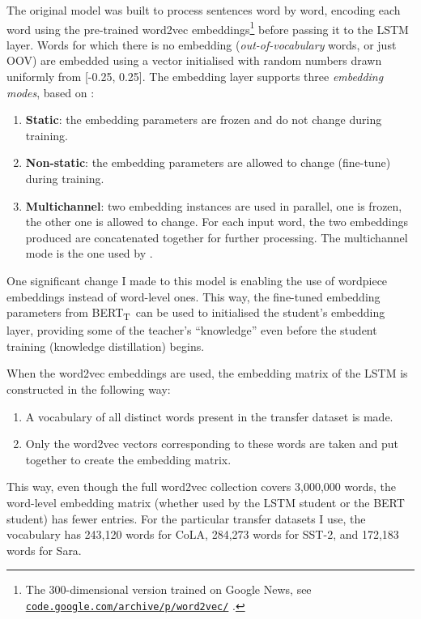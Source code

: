 \documentclass[bsc,frontabs,singlespacing,parskip,deptreport]{infthesis}
\def\BERTT{BERT\textsubscript{T}}
\newcommand\rurl[1]{%
  \href{https://#1}{\nolinkurl{#1}}%
}
\begin{document}
{{{      The original model was built to process sentences word by word, encoding each word using the pre-trained word2vec embeddings\footnote{The 300-dimensional version trained on Google News, see \rurl{code.google.com/archive/p/word2vec/}.} before passing it to the LSTM layer. Words for which there is no embedding (\textit{out-of-vocabulary} words, or just OOV) are embedded using a vector initialised with random numbers drawn uniformly from [-0.25, 0.25]. The embedding layer supports three \textit{embedding modes}, based on \citet{Kim_2014}:
      \begin{enumerate}
        \item \textbf{Static}: the embedding parameters are frozen and do not change during training.
        \item \textbf{Non-static}: the embedding parameters are allowed to change (fine-tune) during training.
        \item \textbf{Multichannel}: two embedding instances are used in parallel, one is frozen, the other one is allowed to change. For each input word, the two embeddings produced are concatenated together for further processing. The multichannel mode is the one used by \citeauthor{Tang_2019b}.
      \end{enumerate}

      One significant change I made to this model is enabling the use of wordpiece embeddings instead of word-level ones. This way, the fine-tuned embedding parameters from \BERTT~can be used to initialised the student's embedding layer, providing some of the teacher's ``knowledge'' even before the student training (knowledge distillation) begins.

      When the word2vec embeddings are used, the embedding matrix of the LSTM is constructed in the following way:
      \begin{enumerate}
        \item A vocabulary of all distinct words present in the transfer dataset is made.
        \item Only the word2vec vectors corresponding to these words are taken and put together to create the embedding matrix.
      \end{enumerate}
      This way, even though the full word2vec collection covers 3,000,000 words, the word-level embedding matrix (whether used by the LSTM student or the BERT student) has fewer entries. For the particular transfer datasets I use, the vocabulary has 243,120 words for CoLA, 284,273 words for SST-2, and 172,183 words for Sara.

}}}
\end{document}
